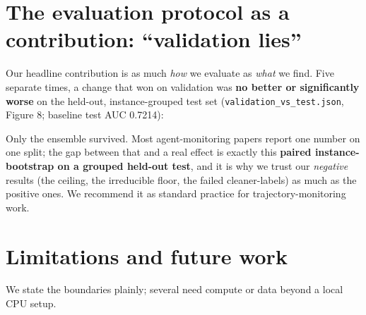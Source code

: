 \section{The evaluation protocol as a contribution: ``validation lies''}
Our headline contribution is as much \emph{how} we evaluate as \emph{what} we find. Five separate times, a change that won on validation was \textbf{no better or significantly worse} on the held-out, instance-grouped test set (\texttt{validation\_vs\_test.json}, Figure 8; baseline test AUC 0.7214):

\begin{center}\small
{}
\end{center}
Only the ensemble survived. Most agent-monitoring papers report one number on one split; the gap between that and a real effect is exactly this \textbf{paired instance-bootstrap on a grouped held-out test}, and it is why we trust our \emph{negative} results (the ceiling, the irreducible floor, the failed cleaner-labels) as much as the positive ones. We recommend it as standard practice for trajectory-monitoring work.

\section{Limitations and future work}
We state the boundaries plainly; several need compute or data beyond a local CPU setup.

